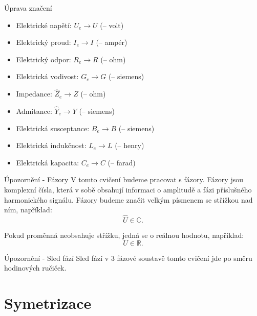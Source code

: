 \documentclass{article}
\begin{document}
\maketitle
\tableofcontents
\vspace{1cm}

\begin{dangerbox}{Úprava značení}
    \begin{itemize}
        \item Elektrické napětí: $U_e \rightarrow U$ (\ueqV \fs -- volt)
        \item Elektrický proud: $I_e \rightarrow I$ (\ueqA \fs -- ampér)
        \item Elektrický odpor: $R_e \rightarrow R$ (\ueqOHM \fs -- ohm)
        \item Elektrická vodivost: $G_e \rightarrow G$ (\ueqSIE \fs -- siemens)
        \item Impedance: $\hat{Z}_e \rightarrow Z$ (\ueqOHM \fs -- ohm)
        \item Admitance: $\hat{Y}_e \rightarrow Y$ (\ueqSIE \fs -- siemens)
        \item Elektrická susceptance: $B_e \rightarrow B$ (\ueqSIE \fs -- siemens)
        \item Elektrická indukčnost: $L_e \rightarrow L$ (\ueqHENRY \fs -- henry)
        \item Elektrická kapacita: $C_e \rightarrow C$ (\ueqFARAD \fs -- farad)
    \end{itemize}
\end{dangerbox}

\begin{dangerbox}{Úpozornění - Fázory}
    V tomto cvičení budeme pracovat s fázory. Fázory jsou komplexní čísla, která v sobě obsahují informaci o amplitudě a fázi příslušného harmonického signálu. Fázory budeme značit velkým písmenem se střížkou nad ním, například:
    $$
        \hat{U} \in \mathbb{C}.
    $$

    Pokud proměnná neobsahuje střížku, jedná se o reálnou hodnotu, například:
    $$
        U \in \mathbb{R}.
    $$
\end{dangerbox}

\begin{dangerbox}{Úpozornění - Sled fází}
    Sled fází v 3 fázové soustavě tomto cvičení jde po směru hodinových ručiček.
\end{dangerbox}

\newpage




\section{ Symetrizace \spicy \spicy}
\end{document}
